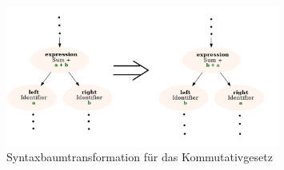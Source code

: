 \begin{figure}[H]
	\caption{Syntaxbaumtransformation für das Kommutativgesetz}
	\label{fig:TreeTransformKommutativ}
	\centering
	\includegraphics[width=0.8\textwidth]{./img/tree-transform.png}
\end{figure}